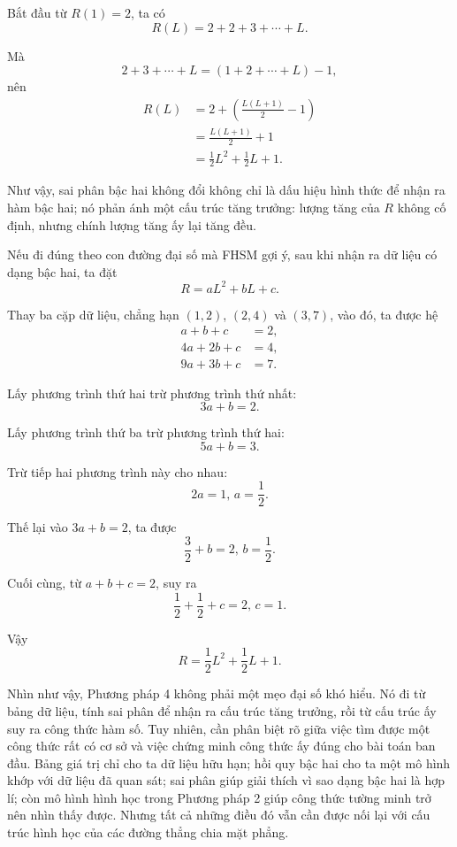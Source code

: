 {    Bắt đầu từ $R(1)=2$, ta có
    $$
        R(L)=2+2+3+\cdots+L.
    $$

    Mà
    $$
        2+3+\cdots+L=(1+2+\cdots+L)-1,
    $$
    nên
    \begin{align*}
        R(L)
        &=2+\left(\frac{L(L+1)}{2}-1\right)\\
        &=\frac{L(L+1)}{2}+1\\
        &=\frac12L^2+\frac12L+1.
    \end{align*}

    Như vậy, sai phân bậc hai không đổi không chỉ là dấu hiệu hình thức để nhận ra hàm bậc hai; nó phản ánh một cấu trúc tăng trưởng: lượng tăng của $R$ không cố định, nhưng chính lượng tăng ấy lại tăng đều.

    Nếu đi đúng theo con đường đại số mà FHSM gợi ý, sau khi nhận ra dữ liệu có dạng bậc hai, ta đặt
    $$
      R=aL^2+bL+c.
    $$

    Thay ba cặp dữ liệu, chẳng hạn $(1,2)$, $(2,4)$ và $(3,7)$, vào đó, ta được hệ
    \begin{align*}
        a+b+c&=2,\\
        4a+2b+c&=4,\\
        9a+3b+c&=7.
    \end{align*}

    Lấy phương trình thứ hai trừ phương trình thứ nhất:
    $$
      3a+b=2.
    $$

    Lấy phương trình thứ ba trừ phương trình thứ hai:
    $$
      5a+b=3.
    $$

    Trừ tiếp hai phương trình này cho nhau:
    $$
        2a=1,\, a=\frac12.
    $$

    Thế lại vào $3a+b=2$, ta được
    $$
        \frac32+b=2,\, b=\frac12.
    $$

    Cuối cùng, từ $a+b+c=2$, suy ra
    $$
        \frac12+\frac12+c=2,\, c=1.
    $$

    Vậy
    $$
        R=\frac12L^2+\frac12L+1.
    $$

    Nhìn như vậy, Phương pháp 4 không phải một mẹo đại số khó hiểu. Nó đi từ bảng dữ liệu, tính sai phân để nhận ra cấu trúc tăng trưởng, rồi từ cấu trúc ấy suy ra công thức hàm số. Tuy nhiên, cần phân biệt rõ giữa việc tìm được một công thức rất có cơ sở và việc chứng minh công thức ấy đúng cho bài toán ban đầu. Bảng giá trị chỉ cho ta dữ liệu hữu hạn; hồi quy bậc hai cho ta một mô hình khớp với dữ liệu đã quan sát; sai phân giúp giải thích vì sao dạng bậc hai là hợp lí; còn mô hình hình học trong Phương pháp 2 giúp công thức tường minh trở nên nhìn thấy được. Nhưng tất cả những điều đó vẫn cần được nối lại với cấu trúc hình học của các đường thẳng chia mặt phẳng.

}
